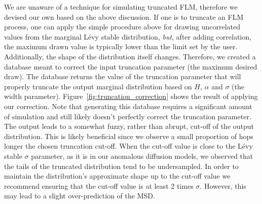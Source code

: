 \documentclass{article}
\begin{document}
  We are unaware of a technique for simulating truncated FLM, therefore we devised our
  own based on the above discussion. If one is to truncate an FLM process, one can apply
  the simple procedure above for drawing uncorrelated values from the marginal L\'evy 
  stable distribution, \textit{but}, after adding correlation, the maximum drawn value is typically lower than the limit set 
  by the user. Additionally, the shape of the distribution itself changes. Therefore, 
  we created a database meant to correct the input truncation parameter (the maximum desired draw). The database
  returns the value of the truncation parameter that will properly truncate the
  output marginal distribution based on $H$, $\alpha$ and $\sigma$ (the width parameter).
  Figure~\ref{fig:truncation_correction} shows the result of applying our correction.
  Note that generating this database requires a significant amount of simulation and
  still likely doesn't perfectly correct the truncation parameter. The output leads
  to a somewhat fuzzy, rather than abrupt, cut-off of the output distribution. This 
  is likely beneficial since we observe a small proportion of hops longer the chosen
  truncation cut-off. When the cut-off value is close to the L\'evy stable $\sigma$ parameter,
  as it is in our anomalous diffusion models, we observed that the tails of the 
  truncated distribution tend to be undersampled. In order to maintain the distribution's 
  approximate shape up to the cut-off value we recommend ensuring that the cut-off
  value is at least 2 times $\sigma$. However, this may lead to a slight over-prediction
  of the MSD.
  
\end{document}
